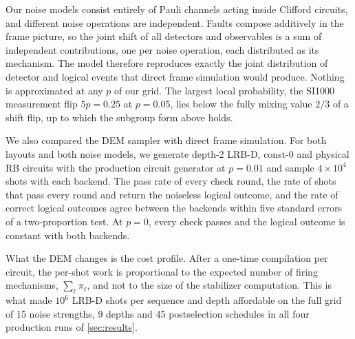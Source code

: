 Our noise models consist entirely of Pauli channels acting inside Clifford circuits, and different noise operations are independent. Faults compose additively in the frame picture, so the joint shift of all detectors and observables is a sum of independent contributions, one per noise operation, each distributed as its mechanism. The model therefore reproduces exactly the joint distribution of detector and logical events that direct frame simulation would produce. Nothing is approximated at any $p$ of our grid. The largest local probability, the SI1000 measurement flip $5p = 0.25$ at $p = 0.05$, lies below the fully mixing value $2/3$ of a shift flip, up to which the subgroup form above holds.

We also compared the DEM sampler with direct frame simulation. For both layouts and both noise models, we generate depth-2 LRB-D, const-0 and physical RB circuits with the production circuit generator at $p = 0.01$ and sample $4 \times 10^4$ shots with each backend. The pass rate of every check round, the rate of shots that pass every round and return the noiseless logical outcome, and the rate of correct logical outcomes agree between the backends within five standard errors of a two-proportion test. At $p = 0$, every check passes and the logical outcome is constant with both backends.

What the DEM changes is the cost profile. After a one-time compilation per circuit, the per-shot work is proportional to the expected number of firing mechanisms, $\sum_\ell \pi_\ell$, and not to the size of the stabilizer computation. This is what made $10^6$ LRB-D shots per sequence and depth affordable on the full grid of 15 noise strengths, 9 depths and 45 postselection schedules in all four production runs of \autoref{sec:results}.
